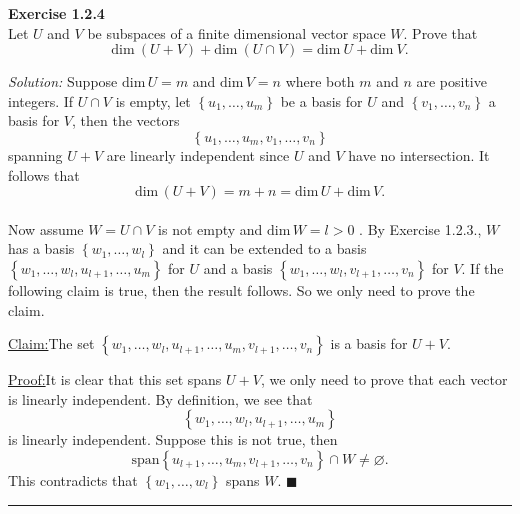 \documentclass[a4paper, 11pt]{article}
\newenvironment{problem}[2][Exercise]
    { \begin{mdframed}[backgroundcolor=gray!20] \textbf{#1 #2} \\}
    {  \end{mdframed}}
\newenvironment{solution}
    {\textit{Solution:}}
    {}
\newenvironment{claim}[1]{\par\noindent\underline{Claim:}\space#1}{}
\newenvironment{claimproof}[1]{\par\noindent\underline{Proof:}\space#1}{\hfill $\blacksquare$}
\begin{document}
\begin{problem}{1.2.4}
Let \(U\) and \(V\) be subspaces of a finite dimensional vector space \(W\). Prove that 
$$\text{dim}\ (U+V)+\text{dim}\ (U\cap V)=\text{dim}\ U+\text{dim}\ V.$$

\end{problem}
\begin{solution}
Suppose \(\text{dim}\, U=m\) and \(\text{dim}\, V=n\) where both \(m\) and \(n\) are positive integers. If \(U\cap V\) is empty, let \(\left\{u_1,\ldots,u_m\right \}\) be a basis for \(U\) and \(\left\{ v_1,\ldots,v_n\right\}\) a basis for \(V\), then the vectors
$$\left\{u_1,\ldots,u_m, v_1,\ldots,v_n\right\} $$
spanning \(U+V\) are linearly independent since \(U\) and \(V\) have no intersection. It follows that 
$$\text{dim}\, (U+V)=m+n=\text{dim}\, U+\text{dim}\, V.$$
\\
Now assume \(W=U\cap V\) is not empty and \(\text{dim}\, W=l>0\) . By Exercise 1.2.3., \(W\) has a basis \(\left\{w_1,\ldots,w_l\right\}\) and it can be extended to a basis \(\left\{w_1,\ldots,w_l,u_{l+1},\ldots, u_m\right\}\) for \(U\) and a basis \(\left\{w_1,\ldots,w_l,v_{l+1},\ldots,v_n\right\}\) for \(V\). If the following claim is true, then the result follows. So we only need to prove the claim.
\begin{claim}
The set \(\left\{w_1,\ldots,w_l,u_{l+1},\ldots,u_m,v_{l+1},\ldots,v_n\right\}\) is a basis for \(U+V\).
\end{claim}


\begin{claimproof}
It is clear that this set spans \(U+V\), we only need to prove that each vector is linearly independent. By definition, we see that 
$$\left\{ w_1,\ldots,w_l,u_{l+1},\ldots,u_m \right\}$$
is linearly independent. Suppose this is not true, then 
$$\text{span}\left\{u_{l+1},\ldots,u_m,v_{l+1},\ldots,v_n\right\}\cap W\neq \varnothing.$$
This contradicts that \(\left\{w_1,\ldots,w_l\right\}\) spans \(W\). 
\end{claimproof}
\end{solution} 


\noindent\rule{7in}{2.8pt}
\end{document}
